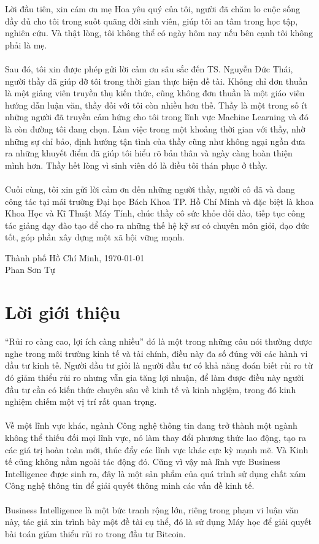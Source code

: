 Lời đầu tiên, xin cám ơn mẹ Hoa yêu quý của tôi, người đã chăm lo cuộc
sống đầy đủ cho tôi trong suốt quãng đời sinh viên, giúp tôi an tâm trong học
tập, nghiên cứu. Và thật lòng, tôi không thể có ngày hôm nay nếu bên 
cạnh tôi không phải là mẹ.\\\\
Sau đó, tôi xin được phép gửi lời cảm ơn sâu sắc đến TS. Nguyễn Đức Thái,
người thầy đã giúp đỡ tôi trong thời gian thực hiện đề tài.
Không chỉ đơn thuần là một giảng viên truyền thụ kiến thức, cũng không đơn thuần
là một giáo viên hướng dẫn luận văn, thầy đối với tôi còn nhiều hơn thế. Thầy là
một trong số ít những người đã truyền cảm hứng cho tôi trong lĩnh vực Machine
Learning và đó là còn đường tôi đang chọn. Làm việc trong một khoảng thời gian
với thầy, nhờ những sự chỉ bảo, định hướng tận tình của thầy cũng như không
ngại ngần đưa ra những khuyết điểm đã giúp tôi hiểu rõ bản thân và ngày càng hoàn thiện mình hơn.
Thầy hết lòng vì sinh viên đó là điều tôi thán phục ở thầy.\\\\
Cuối cùng, tôi xin gửi lời cảm ơn đến những người thầy, người cô đã và đang công tác
tại mái trường Đại học Bách Khoa TP. Hồ Chí Minh và đặc biệt là khoa Khoa Học và
Kĩ Thuật Máy Tính, chúc thầy cô sức khỏe dồi dào, tiếp tục công tác giảng dạy
đào tạo để cho ra những thế hệ kỹ sư có chuyên môn giỏi, đạo đức tốt, góp phần
 xây dựng một xã hội vững mạnh.
 \vspace{2cm}
 \begin{flushright}
 Thành phố Hồ Chí Minh, \MakeLowercase{\today}\\ 
Phan Sơn Tự\\
 \end{flushright}
\pagebreak

\section*{Lời giới thiệu}
\thispagestyle{plain} 
``Rủi ro càng cao, lợi ích càng nhiều'' đó là một trong những câu nói thường
được nghe trong môi trường kinh tế và tài chính, điều này đa số đúng với các hành vi đầu tư
kinh tế. Người đầu tư giỏi là người đầu tư có khả năng đoán biết rủi ro từ đó
giảm thiểu rủi ro nhưng vẫn gia tăng lợi nhuận, để làm được điều này người
đầu tư cần có kiến thức chuyên sâu về kinh tế và kinh nhgiệm, trong đó kinh 
nghiệm chiếm một vị trí rất quan trọng.\\\\
Về một lĩnh vực khác, ngành Công nghệ thông tin đang trở thành một ngành không 
thể thiếu đối mọi lĩnh vực, nó làm thay đổi phương thức lao động, tạo ra các 
giá trị hoàn toàn mới, thúc đẩy các lĩnh vực khác cực kỳ mạnh mẽ. Và Kinh tế 
cũng không nằm ngoài tác động đó. Cũng vì vậy mà lĩnh vực Business Intelligence
được sinh ra, đây là một sản phẩm của quá trình sử dụng chất xám Công nghệ 
thông tin để giải quyết thông minh các vấn đề kinh tế.\\\\
Business Intelligence là một bức tranh rộng lớn, riêng trong phạm vi luận văn 
này, tác giả xin trình bày một đề tài cụ thể, đó là sử dụng Máy học để 
giải quyết bài toán giảm thiểu rủi ro trong đầu tư Bitcoin.
\pagebreak
